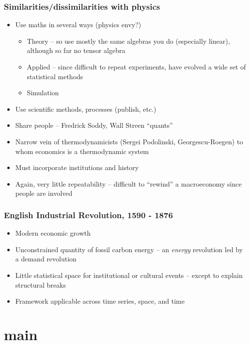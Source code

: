 \documentclass[final]{beamer}
\begin{document}
\begin{frame}
\frametitle{Similarities/dissimilarities with physics}
\begin{itemize}
\item Use maths in several ways (physics envy?)
	\begin{itemize}
	\item Theory -- so use mostly the same algebras you do (especially linear), although so far no tensor algebra
	\item Applied -- since difficult to repeat experiments, have evolved a wide set of statistical methods
	\item Simulation
	\end{itemize}
\item Use scientific methods, processes (publish, etc.)
\item Share people -- Fredrick Soddy, Wall Streen ``quants''
\item Narrow vein of thermodynamicists (Sergei Podolinski, Georgescu-Roegen) to whom economics is a thermodynamic system
\item Must incorporate institutions and history
\item Again, very little repeatability -- difficult to ``rewind'' a macroeconomy since people are involved
\end{itemize}
\end{frame}

\begin{frame}
\frametitle{English Industrial Revolution, 1590 - 1876}

	\begin{itemize}
	\item Modern economic growth
	\item Unconstrained quantity of fossil carbon energy -- an \textit{energy} revolution led by a demand revolution
	\item Little statistical space for institutional or cultural events -- except to explain structural breaks
	\item Framework applicable across time series, space, and time
	\end{itemize}
\end{frame}

\section{main}
\end{document}
